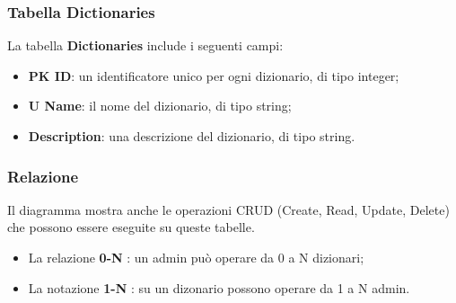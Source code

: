 \subsubsection{Tabella Dictionaries}
La tabella \textbf{Dictionaries} include i seguenti campi:
\begin{itemize}
    \item \textbf{PK ID}: un identificatore unico per ogni dizionario, di tipo integer;
    \item \textbf{U Name}: il nome del dizionario, di tipo string;
    \item \textbf{Description}: una descrizione del dizionario, di tipo string.
\end{itemize}

\subsubsection{Relazione}
Il diagramma mostra anche le operazioni CRUD (Create, Read, Update, Delete) che possono essere eseguite su queste tabelle. 

\begin{itemize}
    \item La relazione \textbf{0-N} : un admin può operare da 0 a N dizionari;
    \item La notazione \textbf{1-N} : su un dizonario possono operare da 1 a N admin.
\end{itemize}